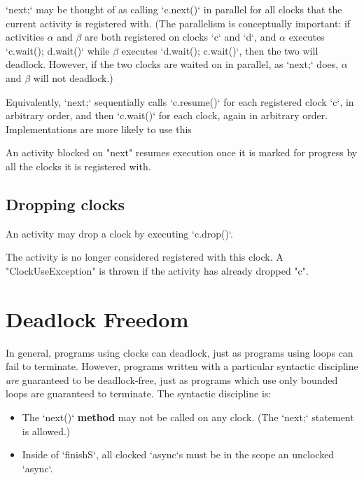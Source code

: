 \xcd`next;` may be thought of as calling \xcd`c.next()` in parallel for all
clocks that the current activity is registered with.  (The parallelism is
conceptually important: if activities {$\alpha$} and {$\beta$} are both
registered on clocks \xcd`c` and \xcd`d`, and {$\alpha$} executes
\xcd`c.wait(); d.wait()` while {$\beta$} executes \xcd`d.wait(); c.wait()`,
then the two will deadlock.  However, if the two clocks are waited on in
parallel, as \xcd`next;` does, {$\alpha$} and {$\beta$} will not deadlock.)

Equivalently, \xcd`next;` sequentially calls \xcd`c.resume()` for each
registered clock \xcd`c`, in arbitrary order, and then \xcd`c.wait()` for each
clock, again in arbitrary order.  Implementations are more likely to use this 



An activity blocked on \xcd"next" resumes execution once
it is marked for progress by all the clocks it is registered with.

\subsection{Dropping clocks}\label{sec:clock:drop}
An activity may drop a clock by executing \xcd`c.drop()`.



\noindent{} The activity is no longer considered registered with this
clock.  A \xcd"ClockUseException" is thrown if the activity has
already dropped \xcd"c".

\section{Deadlock Freedom}

In general, programs using clocks can deadlock, just as programs using loops
can fail to terminate.  However, programs written with a particular syntactic
discipline {\em are} guaranteed to be deadlock-free, just as programs which
use only bounded loops are guaranteed to terminate.  The syntactic discipline
is: 
\begin{itemize}
\item The \xcd`next()` {\bf method} may not be called on any clock. (The
      \xcd`next;` statement is allowed.)
\item Inside of \xcd`finish{S}`, all clocked \xcd`async`s must be in the scope
      an unclocked \xcd`async`.  
\end{itemize}


